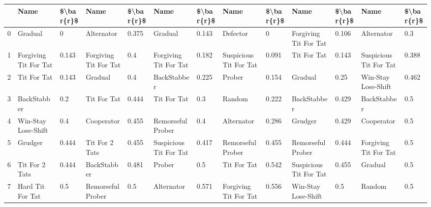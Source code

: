 \begin{tabular}{lllllllllllll}
\toprule
{} &                    Name & \$\textbackslash bar\{r\}\$ &                    Name & \$\textbackslash bar\{r\}\$ &                    Name & \$\textbackslash bar\{r\}\$ &                    Name & \$\textbackslash bar\{r\}\$ &                    Name & \$\textbackslash bar\{r\}\$ &                    Name & \$\textbackslash bar\{r\}\$ \\
\midrule
0  &                 Gradual &         0 &              Alternator &     0.375 &                 Gradual &     0.143 &                Defector &         0 &   Forgiving Tit For Tat &     0.106 &              Alternator &       0.3 \\
1  &   Forgiving Tit For Tat &     0.143 &   Forgiving Tit For Tat &       0.4 &   Forgiving Tit For Tat &     0.182 &  Suspicious Tit For Tat &     0.091 &             Tit For Tat &     0.143 &  Suspicious Tit For Tat &     0.388 \\
2  &             Tit For Tat &     0.143 &                 Gradual &       0.4 &             BackStabber &     0.225 &                  Prober &     0.154 &                 Gradual &      0.25 &     Win-Stay Lose-Shift &     0.462 \\
3  &             BackStabber &       0.2 &             Tit For Tat &     0.444 &             Tit For Tat &       0.3 &                  Random &     0.222 &             BackStabber &     0.429 &             BackStabber &       0.5 \\
4  &     Win-Stay Lose-Shift &       0.4 &              Cooperator &     0.455 &       Remorseful Prober &       0.4 &              Alternator &     0.286 &                 Grudger &     0.429 &              Cooperator &       0.5 \\
5  &                 Grudger &     0.444 &          Tit For 2 Tats &     0.455 &  Suspicious Tit For Tat &     0.417 &       Remorseful Prober &     0.455 &       Remorseful Prober &     0.444 &   Forgiving Tit For Tat &       0.5 \\
6  &          Tit For 2 Tats &     0.444 &             BackStabber &     0.481 &                  Prober &       0.5 &             Tit For Tat &     0.542 &  Suspicious Tit For Tat &     0.455 &                 Gradual &       0.5 \\
7  &        Hard Tit For Tat &       0.5 &       Remorseful Prober &       0.5 &              Alternator &     0.571 &   Forgiving Tit For Tat &     0.556 &     Win-Stay Lose-Shift &       0.5 &                  Random &       0.5 \\

\end{tabular}
